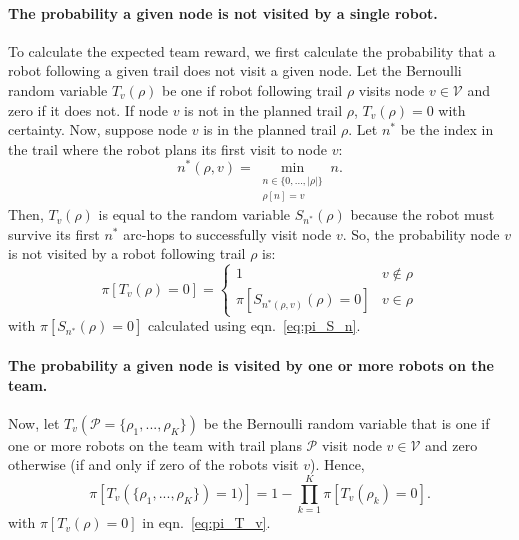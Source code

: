 \documentclass[11pt, oneside]{article}
\begin{document}
\paragraph{The probability a given node is not visited by a single robot.} 
To calculate the expected team reward, we first calculate the probability that a robot following a given trail does not visit a given node.
Let the Bernoulli random variable $T_v(\rho)$ be one if robot following trail $\rho$ visits node $v\in \mathcal{V}$ and zero if it does not.
If node $v$ is not in the planned trail $\rho$, $T_v(\rho)=0$ with certainty. 
Now, suppose node $v$ is in the planned trail $\rho$. Let $n^*$ be the index in the trail where the robot plans its first visit to node $v$:
\begin{equation}
n^*(\rho, v) = \min_{
	\substack{n \in \{0, ..., \lvert \rho \rvert\} \\ \rho[n] = v}
} n.
\end{equation}
Then, $T_v(\rho)$ is equal to the random variable $S_{n^*}(\rho)$ because the robot must survive its first $n^*$ arc-hops to successfully visit node $v$. 
So, the probability node $v$ is not visited by a robot following trail $\rho$ is:
\begin{equation}
	\pi[T_v(\rho) = 0] = 
	\begin{cases}
		1 & v\notin \rho\\
		 \pi [S_{n^*(\rho, v)}(\rho)=0 ] & v \in \rho
	\end{cases}
	 \label{eq:pi_T_v}
\end{equation}
with $\pi[S_{n^*}(\rho)=0]$ calculated using eqn.~\ref{eq:pi_S_n}.

\paragraph{The probability a given node is visited by one or more robots on the team.} 
Now, let $T_v(\mathcal{P}=\{\rho_1, ..., \rho_K\} )$ be the Bernoulli random variable that is one if one or more robots on the team with trail plans $\mathcal{P}$ visit node $v\in\mathcal{V}$ and zero otherwise (if and only if zero of the robots visit $v$). Hence,
\begin{equation}
	\pi [T_v(\{\rho_1, ..., \rho_K\} ) = 1)] = 
	1 - \prod_{k=1}^K \pi[T_v(\rho_k)=0].
	\label{eq:pi_T_v_all}
\end{equation} 
with $\pi[T_v(\rho) = 0]$ in eqn.~\ref{eq:pi_T_v}.
\end{document}
